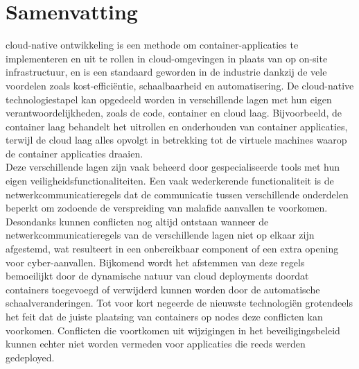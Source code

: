 \chapter{Samenvatting}                                 \label{ch:abstractNL}

cloud-native ontwikkeling is een methode om container-applicaties te implementeren en uit te rollen in cloud-omgevingen in plaats van op on-site infrastructuur, en is een standaard geworden in de industrie dankzij de vele voordelen zoals kost-efficiëntie, schaalbaarheid en automatisering. De cloud-native technologiestapel kan opgedeeld worden in verschillende lagen met hun eigen verantwoordelijkheden, zoals de code, container en cloud laag. Bijvoorbeeld, de container laag behandelt het uitrollen en onderhouden van container applicaties, terwijl de cloud laag alles opvolgt in betrekking tot de virtuele machines waarop de container applicaties draaien.
\\[10pt]

Deze verschillende lagen zijn vaak beheerd door gespecialiseerde tools met hun eigen veiligheidsfunctionaliteiten. Een vaak wederkerende functionaliteit is de netwerkcommunicatieregels dat de communicatie tussen verschillende onderdelen beperkt om zodoende de verspreiding van malafide aanvallen te voorkomen. Desondanks kunnen conflicten nog altijd ontstaan wanneer de netwerkcommunicatieregels van de verschillende lagen niet op elkaar zijn afgestemd, wat resulteert in een onbereikbaar component of een extra opening voor cyber-aanvallen. Bijkomend wordt het afstemmen van deze regels bemoeilijkt door de dynamische natuur van cloud deployments doordat containers toegevoegd of verwijderd kunnen worden door de automatische schaalveranderingen. Tot voor kort negeerde de nieuwste technologiën grotendeels het feit dat de juiste plaatsing van containers op nodes deze conflicten kan voorkomen. Conflicten die voortkomen uit wijzigingen in het beveiligingsbeleid kunnen echter niet worden vermeden voor applicaties die reeds werden gedeployed.
\\[10pt]

